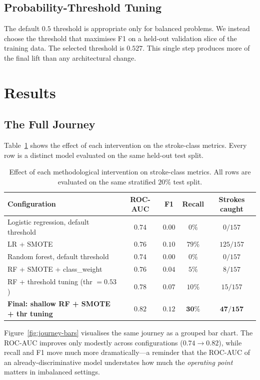 \documentclass[pdflatex,sn-basic,Numbered]{sn-jnl}
\theoremstyle{thmstyleone}
\theoremstyle{thmstyletwo}
\theoremstyle{thmstylethree}
\begin{document}
\subsection{Probability-Threshold Tuning}
The default $0.5$ threshold is appropriate only for balanced problems. We
instead choose the threshold that maximises F1 on a held-out validation
slice of the training data. The selected threshold is $0.527$. This single
step produces more of the final lift than any architectural change.

\section{Results}\label{sec:results}

\subsection{The Full Journey}
Table~\ref{tab:journey} shows the effect of each intervention on the
stroke-class metrics. Every row is a distinct model evaluated on the same
held-out test split.

\begin{table}[htbp]
\centering
\caption{Effect of each methodological intervention on stroke-class metrics.
All rows are evaluated on the same stratified $20\%$ test split.}
\label{tab:journey}
\begin{tabular}{@{}lcccc@{}}
\toprule
Configuration & ROC-AUC & F1 & Recall & Strokes caught \\
\midrule
Logistic regression, default threshold      & $0.74$ & $0.00$ & $0\%$  & $0/157$ \\
LR + SMOTE                                   & $0.76$ & $0.10$ & $79\%$ & $125/157$ \\
Random forest, default threshold             & $0.74$ & $0.00$ & $0\%$  & $0/157$ \\
RF + SMOTE + class\_weight                   & $0.76$ & $0.04$ & $5\%$  & $8/157$ \\
RF + threshold tuning (thr $=0.53$)          & $0.78$ & $0.07$ & $10\%$ & $15/157$ \\
\textbf{Final: shallow RF + SMOTE + thr tuning} & $\mathbf{0.82}$ & $\mathbf{0.12}$ & $\mathbf{30\%}$ & $\mathbf{47/157}$ \\
\bottomrule
\end{tabular}
\end{table}

Figure~\ref{fig:journey-bars} visualises the same journey as a grouped bar
chart. The ROC-AUC improves only modestly across configurations
($0.74 \to 0.82$), while recall and F1 move much more dramatically---a
reminder that the ROC-AUC of an already-discriminative model understates
how much the \emph{operating point} matters in imbalanced settings.
\end{document}
